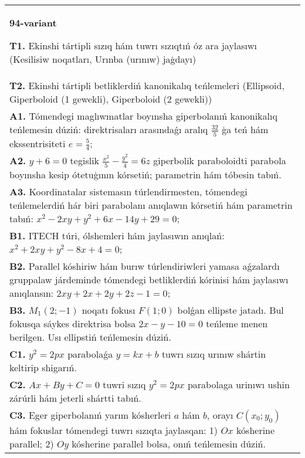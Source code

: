 \documentclass{article}
\begin{document}
\begin{tabular}{m{17cm}}
\textbf{94-variant}
\newline

\textbf{T1.} Ekinshi tártipli sızıq hám tuwrı sızıqtıń óz ara jaylasıwı (Kesilisiw noqatları, Urınba (urınıw) jaģdayı) \\
\textbf{T2.} Ekinshi tártipli betliklerdiń kanonikalıq teńlemeleri (Ellipsoid, Giperboloid (1 gewekli), Giperboloid (2 gewekli)) \\
\textbf{A1.} Tómendegi maglıwmatlar boyınsha giperbolanıń kanonikalıq teńlemesin dúziń: direktrisaları arasındaǵı aralıq $\frac{32}{5}$ ģa teń hám ekssentrisiteti $e=\frac{5}{4}$; \\
\textbf{A2.} $y+6=0$ tegislik $\frac{x^2}{5}-\frac{y^2}{4}=6 z$ giperbolik paraboloidti parabola boyınsha kesip ótetuģının kórsetiń; parametrin hám tóbesin tabıń. \\
\textbf{A3.} Koordinatalar sistemasın túrlendirmesten, tómendegi teńlemelerdiń hár biri parabolanı anıqlawın kórsetiń hám parametrin tabıń: $x^2-2 x y+y^2+6 x-14 y+29=0$; \\
\textbf{B1.} ITECH túri, ólshemleri hám jaylasıwın anıqlań: $x^2+2 x y+y^2-8 x+4=0$; \\
\textbf{B2.} Parallel kóshiriw hám burıw túrlendiriwleri yamasa aǵzalardı gruppalaw járdeminde tómendegi betliklerdiń kórinisi hám jaylasıwı anıqlansın: $2 x y+2 x+2 y+2 z-1=0$; \\
\textbf{B3.} $M_1 (2;-1) $ noqatı fokusı $F (1;0) $ bolǵan ellipste jatadı. Bul fokusqa sáykes direktrisa bolsa $2x-y-10=0$ teńleme menen berilgen. Usı ellipstiń teńlemesin dúziń. \\
\textbf{C1.} $y^2=2 p x$ parabolaǵa $y=k x+b$ tuwrı sızıq urınıw shártin keltirip shigarıń. \\
\textbf{C2.} $A x+B y+C=0$ tuwri sızıq $y^2=2 p x$ parabolaga urinıwı ushin zárúrli hám jeterli shártti tabıń. \\
\textbf{C3.} Eger giperbolanıń yarım kósherleri $a$ hám $b$, orayı $C\left(x_0; y_0\right) $ hám fokuslar tómendegi tuwrı sızıqta jaylasqan: 1) $O x$ kósherine parallel; 2) $O y$ kósherine parallel bolsa, onıń teńlemesin dúziń. \\

\end{tabular}
\vspace{1cm}
\end{document}
